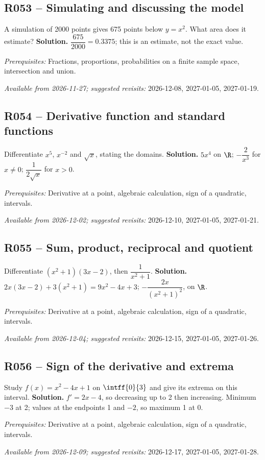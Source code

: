 \subsection*{R053 -- Simulating and discussing the model}\label{R053}
A simulation of 2000 points gives 675 points below $y=x^2$. What area does it estimate?
\ifmxteacher\textbf{Solution.} $\dfrac{675}{2000}=\num{0,3375}$; this is an estimate, not the exact value.\par\textit{Prerequisites:} Fractions, proportions, probabilities on a finite sample space, intersection and union.\par\textit{Available from 2026-11-27; suggested revisits:} 2026-12-08, 2027-01-05, 2027-01-19.\fi
{}\subsection*{R054 -- Derivative function and standard functions}\label{R054}
Differentiate $x^5$, $x^{-2}$ and $\sqrt x$, stating the domains.
\ifmxteacher\textbf{Solution.} $5x^4$ on $\R$; $-\dfrac{2}{x^3}$ for $x\ne0$; $\dfrac{1}{2\sqrt x}$ for $x>0$.\par\textit{Prerequisites:} Derivative at a point, algebraic calculation, sign of a quadratic, intervals.\par\textit{Available from 2026-12-02; suggested revisits:} 2026-12-10, 2027-01-05, 2027-01-21.\fi
{}\subsection*{R055 -- Sum, product, reciprocal and quotient}\label{R055}
Differentiate $(x^2+1)(3x-2)$, then $\dfrac{1}{x^2+1}$.
\ifmxteacher\textbf{Solution.} $2x(3x-2)+3(x^2+1)=9x^2-4x+3$; $-\dfrac{2x}{(x^2+1)^2}$, on $\R$.\par\textit{Prerequisites:} Derivative at a point, algebraic calculation, sign of a quadratic, intervals.\par\textit{Available from 2026-12-04; suggested revisits:} 2026-12-15, 2027-01-05, 2027-01-26.\fi
{}\subsection*{R056 -- Sign of the derivative and extrema}\label{R056}
Study $f(x)=x^2-4x+1$ on $\intff{0}{3}$ and give its extrema on this interval.
\ifmxteacher\textbf{Solution.} $f\prime=2x-4$, so decreasing up to 2 then increasing. Minimum $-3$ at 2; values at the endpoints 1 and $-2$, so maximum 1 at 0.\par\textit{Prerequisites:} Derivative at a point, algebraic calculation, sign of a quadratic, intervals.\par\textit{Available from 2026-12-09; suggested revisits:} 2026-12-17, 2027-01-05, 2027-01-28.\fi
